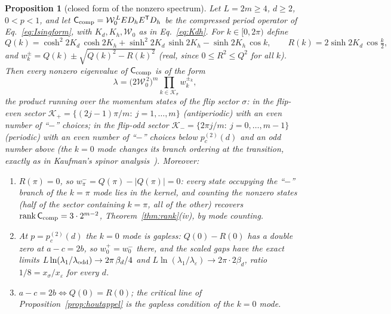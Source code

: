 \documentclass[aps,prx,reprint,superscriptaddress,nobibnotes,longbibliography]{revtex4-2}
\newtheorem{proposition}{Proposition}
\theoremstyle{remark}
\newcommand{\rk}{\operatorname{rank}}
\newcommand{\Ccomp}{\mathsf C_{\rm comp}}
\begin{document}
\begin{proposition}[closed form of the nonzero spectrum]
\label{prop:spectrum}
Let $L=2m\ge4$, $d\ge2$, $0<p<1$, and let $\Ccomp=\mathcal W_0^{\,L}ED_hE^{\mathsf T}D_h$ be the compressed period operator of Eq.~\eqref{eq:Isingform}, with $K_d,K_h,\mathcal W_0$ as in Eq.~\eqref{eq:Kdh}.  For $k\in[0,2\pi)$ define
\begin{equation}
 Q(k)=\cosh^2\!2K_d\,\cosh 2K_h+\sinh^2\!2K_d\,\sinh 2K_h-\sinh 2K_h\,\cos k,\qquad
 R(k)=2\sinh 2K_d\,\cos\tfrac{k}{2},
 \label{eq:QRdef}
\end{equation}
and $w_k^{\pm}=Q(k)\pm\sqrt{Q(k)^2-R(k)^2}$ (real, since $0\le R^2\le Q^2$ for all $k$).  Then every nonzero eigenvalue of $\Ccomp$ is of the form
\begin{equation}
 \lambda=\bigl(2\mathcal W_0^{\,2}\bigr)^m\prod_{k\in\mathcal K_\sigma}w_k^{\pm_k},
 \label{eq:spectrum}
\end{equation}
the product running over the momentum states of the flip sector $\sigma$: in the flip-even sector $\mathcal K_+=\{(2j-1)\pi/m:\ j=1,\dots,m\}$ (antiperiodic) with an \emph{even} number of ``$-$'' choices; in the flip-odd sector $\mathcal K_-=\{2\pi j/m:\ j=0,\dots,m-1\}$ (periodic) with an even number of ``$-$'' choices below $p_c^{(2)}(d)$ and an odd number above (the $k=0$ mode changes its branch ordering at the transition, exactly as in Kaufman's spinor analysis~\cite{Kaufman1949,Newell1950}).  Moreover:
\begin{enumerate}
\item[(i)] $R(\pi)=0$, so $w_\pi^-=Q(\pi)-|Q(\pi)|=0$: every state occupying the ``$-$'' branch of the $k=\pi$ mode lies in the kernel, and counting the nonzero states (half of the sector containing $k=\pi$, all of the other) recovers $\rk\Ccomp=3\cdot2^{m-2}$, Theorem~\ref{thm:rank}(iv), by mode counting.
\item[(ii)] At $p=p_c^{(2)}(d)$ the $k=0$ mode is gapless: $Q(0)-R(0)$ has a double zero at $a-c=2b$, so $w_0^+=w_0^-$ there, and the scaled gaps have the exact limits $L\ln(\lambda_1/\lambda_{\rm odd})\to2\pi\,\beta_d/4$ and $L\ln(\lambda_1/\lambda_\varepsilon)\to2\pi\cdot2\beta_d$, ratio $1/8=x_\sigma/x_\varepsilon$ for every $d$.
\item[(iii)] $a-c=2b\iff Q(0)=R(0)$; the critical line of Proposition~\ref{prop:houtappel} is the gapless condition of the $k=0$ mode.
\end{enumerate}
\end{proposition}
\end{document}

